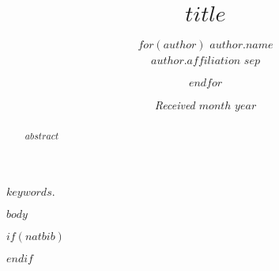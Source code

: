 \documentclass[useAMS,usenatbib$if(referee)$,referee$endif$]{biom}
\title[$header$]{$title$}
\author{$for(author)$ $author.name$ \email{$author.email$} \\ $author.affiliation$ $sep$ \and
		$endfor$
	   }
\begin{document}
\date{{\it Received $month$} $year$}

\pagerange{\pageref{firstpage}--\pageref{lastpage}} 



\label{firstpage}


\begin{abstract}
$abstract$
\end{abstract}

%
%

\begin{keywords}
$keywords$.
\end{keywords}

\maketitle

$body$

$if(natbib)$




$endif$

\label{lastpage}
\end{document}

